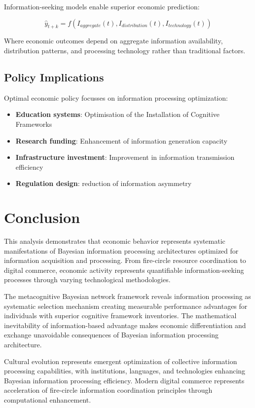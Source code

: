 \documentclass[12pt,a4paper]{article}
\begin{document}
Information-seeking models enable superior economic prediction:

\begin{equation}
\hat{y}_{t+k} = f(I_{aggregate}(t), I_{distribution}(t), I_{technology}(t))
\end{equation}

Where economic outcomes depend on aggregate information availability, distribution patterns, and processing technology rather than traditional factors.

\subsection{Policy Implications}

Optimal economic policy focusses on information processing optimization:

\begin{itemize}
\item \textbf{Education systems}: Optimisation of the Installation of Cognitive Frameworks
\item \textbf{Research funding}: Enhancement of information generation capacity
\item \textbf{Infrastructure investment}: Improvement in information transmission efficiency
\item \textbf{Regulation design}: reduction of information asymmetry
\end{itemize}


\section{Conclusion}

This analysis demonstrates that economic behavior represents systematic manifestations of Bayesian information processing architectures optimized for information acquisition and processing. From fire-circle resource coordination to digital commerce, economic activity represents quantifiable information-seeking processes through varying technological methodologies.

The metacognitive Bayesian network framework reveals information processing as systematic selection mechanism creating measurable performance advantages for individuals with superior cognitive framework inventories. The mathematical inevitability of information-based advantage makes economic differentiation and exchange unavoidable consequences of Bayesian information processing architecture.

Cultural evolution represents emergent optimization of collective information processing capabilities, with institutions, languages, and technologies enhancing Bayesian information processing efficiency. Modern digital commerce represents acceleration of fire-circle information coordination principles through computational enhancement.
\end{document}

